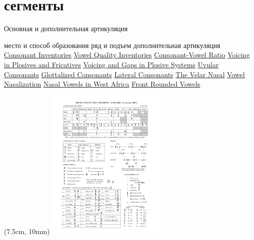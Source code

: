 \section{сегменты}
\begin{frame}{Основная и дополнительная артикуляция}
\begin{itemize}
\mytem \vspace{-2mm} место и способ образования
\mytem ряд и подъем
\mytem дополнительная артикуляция
\mytem \href{http://wals.info/feature/1A}{Consonant Inventories}
\mytem \href{http://wals.info/feature/2A}{Vowel Quality Inventories}
\mytem \href{http://wals.info/feature/3A}{Consonant-Vowel Ratio}
\mytem \href{http://wals.info/feature/4A}{Voicing in Plosives and Fricatives}
\mytem \href{http://wals.info/feature/5A}{Voicing and Gaps in Plosive Systems}
\mytem \href{http://wals.info/feature/6A}{Uvular Consonants}
\mytem \href{http://wals.info/feature/7A}{Glottalized Consonants}
\mytem \href{http://wals.info/feature/8A}{Lateral Consonants}
\mytem \href{http://wals.info/feature/9A}{The Velar Nasal}
\mytem \href{http://wals.info/feature/10A}{Vowel Nasalization}
\mytem \href{http://wals.info/feature/10B}{Nasal Vowels in West Africa}
\mytem \href{http://wals.info/feature/11A}{Front Rounded Vowels}
\end{itemize} 
\begin{textblock*}{6cm}(7.5cm, 10mm)
\href{http://www.yorku.ca/earmstro/ipa/}{\includegraphics[width=5.7cm]{IPA2005.pdf}}
\end{textblock*}
\end{frame}

